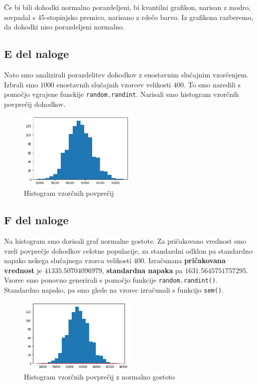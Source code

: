 \documentclass{article}
\begin{document}
Če bi bili dohodki normalno porazdeljeni, bi kvantilni grafikon, narisan z modro, sovpadal s 45-stopinjsko premico,
narisano z rdečo barvo. Iz grafikona razberemo, da dohodki niso porazdeljeni normalno.


\subsection{E del naloge}
Nato smo analizirali porazdelitev dohodkov z enostavnim slučajnim vzorčenjem. Izbrali smo $1000$ enostavnih
slučajnih vzorcev velikosti $400$. To smo naredili s pomočjo vgrajene funckije \texttt{random.randint}. 
Narisali smo histogram vzorčnih povprečij dohodkov.
\begin{figure}[H]
    \begin{center}
        \includegraphics*[width=0.5\textwidth]{figure1E.png}
        \caption{Histogram vzorčnih povprečij}
        \label{hist_vzor}
    \end{center}
\end{figure}


\subsection{F del naloge}
Na histogram smo dorisali graf normalne gostote. Za pričakovano vrednost smo vzeli povprečje dohodkov
celotne populacije, za standardni odklon pa standardno napako nekega slučajnega vzorca velikosti $400$.
Izračunana \textbf{pričakovana vrednost} je $41335.50704096979$, \textbf{standardna napaka} pa 
$1631.5645751757295$.
Vzorec smo ponovno generirali s pomočjo funkcije \texttt{random.randint()}. Standardno napako, pa smo glede na vzorec 
izračunali s funkcijo \texttt{sem()}. 

\begin{figure}[H]
    \begin{center}
        \includegraphics*[width=0.5\textwidth]{figure1F.png}
        \caption{Histogram vzorčnih povprečij z normalno gostoto}
        \label{1F}
    \end{center}
\end{figure}
\end{document}
